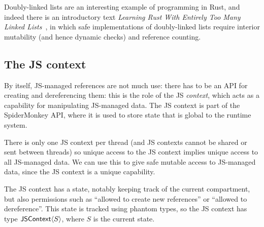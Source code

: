 Doubly-linked lists are an interesting example of programming in Rust,
and indeed there is an introductory text \emph{Learning Rust With
  Entirely Too Many Linked Lists}~\cite{too-many-lists}, in which safe
implementations of doubly-linked lists require interior mutability
(and hence dynamic checks) and reference counting.

\subsection{The JS context}

By itself, JS-managed references are not much use: there has to be an
API for creating and dereferencing them: this is the role of the
JS \emph{context}, which acts as a capability for manipulating
JS-managed data. The JS context is part of the SpiderMonkey API,
where it is used to store state that is global to the runtime system.

There is only one JS context per thread (and JS contexts cannot be shared
or sent between threads) so unique access to the JS context implies unique
access to all JS-managed data. We can use this to give safe mutable access
to JS-managed data, since the JS context is a unique capability.

The JS context has a state, notably keeping track of the current
compartment, but also permissions such as ``allowed to create new
references'' or ``allowed to dereference''.  This state is tracked
using phantom types, so the JS context
has type $\mathsf{JSContext}\langle S\rangle$, where $S$ is the current state.


